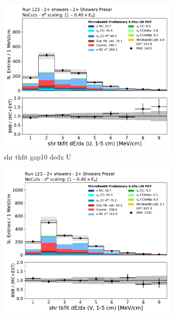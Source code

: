\begin{figure}[H]
    \centering
    \begin{subfigure}{0.3\textwidth}
    \includegraphics[width=1.0\textwidth]{Sidebands/Figures/TwoShr_1e0pSel/Presel/shr_tkfit_gap10_dedx_U.pdf}
    \caption{shr tkfit gap10 dedx U}
    \end{subfigure}
    \begin{subfigure}{0.3\textwidth}
    \includegraphics[width=1.0\textwidth]{Sidebands/Figures/TwoShr_1e0pSel/Presel/shr_tkfit_gap10_dedx_V.pdf}

\end{subfigure}
\end{figure}
